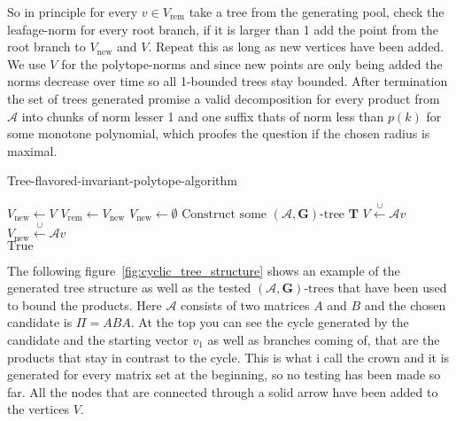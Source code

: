 \newline
So in principle for every $v \in V_{\text{rem}}$ take a tree from the generating pool, check the leafage-norm for every root branch, if it is larger than 1 add the point from the root branch to $V_{\text{new}}$ and $V$. Repeat this as long as new vertices have been added. We use $V$ for the polytope-norms and since new points are only being added the norms decrease over time so all 1-bounded trees stay bounded.
\newline
After termination the set of trees generated promise a valid decomposition for every product from $\mathcal{A}$ into chunks of norm lesser 1 and one suffix thats of norm less than $p(k)$ for some monotone polynomial, which proofes the question if the chosen radius is maximal.

\vspace{1cm}

\begin{algorithm}
  \caption{Tree-flavored-invariant-polytope-algorithm}
  \label{alg:hybrid}
  \begin{algorithmic}
      \State {}
      \State {}
      \State $V_{\text{new}} \gets V$
          \State $V_{\text{rem}} \gets V_{\text{new}}$
          \State $V_{\text{new}} \gets \emptyset$
              \State $\text{Construct some } (\mathcal{A},\mathbf{G})\text{-tree } \mathbf{T}$
                  \State $V \xleftarrow{\cup}\mathcal{A} v$
                  \State $V_{\text{new}} \xleftarrow{\cup} \mathcal{A}v$
              \EndIf  
          \EndFor
      \EndWhile \\
      \Return $\text{True}$
  \end{algorithmic}
\end{algorithm}

\vspace{1cm}

The following figure~\ref{fig:cyclic_tree_structure} shows an example of the generated tree structure as well as the tested $(\mathcal{A},\mathbf{G})\text{-trees}$ that have been used to bound the products. Here $\mathcal{A}$ consists of two matrices $A$ and $B$ and the chosen candidate is $ \Pi = ABA$. At the top you can see the cycle generated by the candidate and the starting vector $v_1$ as well as branches coming of, that are the products that stay in contrast to the cycle. This is what i call the crown and it is generated for every matrix set at the beginning, so no testing has been made so far. All the nodes that are connected through a solid arrow have been added to the vertices $V$.


